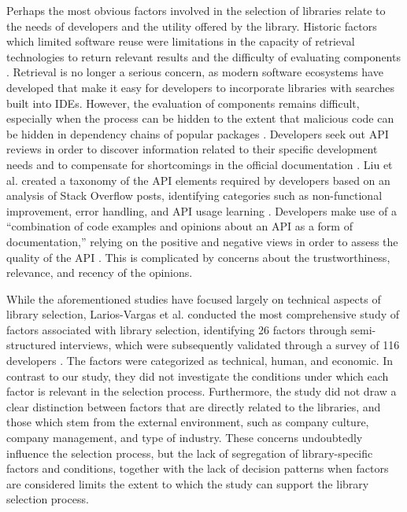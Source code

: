 Perhaps the most obvious factors involved in the selection of libraries relate to the needs of developers and the utility offered by the library. Historic factors which limited software reuse were limitations in the capacity of retrieval technologies to return relevant results and the difficulty of evaluating components \cite{hummel2008code}. Retrieval is no longer a serious concern, as modern software ecosystems have developed that make it easy for developers to incorporate libraries with searches built into IDEs. However, the evaluation of components remains difficult, especially when the process can be hidden to the extent that malicious code can be hidden in dependency chains of popular packages \cite{wyss2022wolf}. Developers seek out API reviews in order to discover information related to their specific development needs and to compensate for shortcomings in the official documentation \cite{uddin2019understanding}. Liu et al. created a taxonomy of the API elements required by developers based on an analysis of Stack Overflow posts, identifying categories such as non-functional improvement, error handling, and API usage learning \cite{liu2021api}. Developers make use of a ``combination of code examples and opinions about an API as a form of documentation,'' relying on the positive and negative views in order to assess the quality of the API \cite{uddin2019understanding}. This is complicated by concerns about the trustworthiness, relevance, and recency of the opinions. %

While the aforementioned studies have focused largely on technical aspects of library selection, Larios-Vargas et al. conducted the most comprehensive study of factors associated with library selection, identifying 26 factors through semi-structured interviews, which were subsequently validated through a survey of 116 developers \cite{larios2020selecting}. The factors were categorized as technical, human, and economic. In contrast to our study, they did not investigate the conditions under which each factor is relevant in the selection process. Furthermore, the study did not draw a clear distinction between factors that are directly related to the libraries, and those which stem from the external environment, such as company culture, company management, and type of industry. These concerns undoubtedly influence the selection process, but the lack of segregation of library-specific factors and conditions, together with the lack of decision patterns when factors are considered limits the extent to which the study can support the library selection process.

